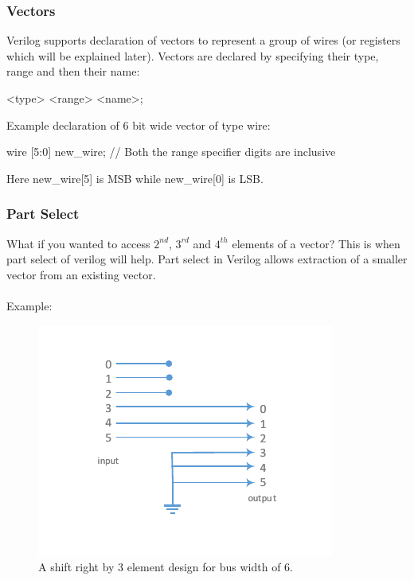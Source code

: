 \documentclass[a4paper,10pt]{article}
\theoremstyle{mytheor}
\newcommand{
  \insertverilog}[3]{
  
}
\begin{document}
\break
\insertverilog{./verilog_files/andGate4.v}{andGate4-wire}{\text{Use of
    wires to connect output of one module to input of another}}

\subsubsection*{Vectors}
Verilog supports declaration of vectors to represent a group of wires
(or registers which will be explained later). Vectors are declared by
specifying their type, range and then their name:
\begin{center}
  <type> <range> <name>;
\end{center}

Example declaration of 6 bit wide vector of type wire:
\begin{center}
  {\color{blue} wire} [{\color{orange}5}:{\color{orange}0}] new\_wire;
  {\color{vgreen}// Both the range specifier digits are inclusive}
\end{center}

Here new\_wire[{\color{orange}5}] is MSB while new\_wire[{\color{orange}0}] is LSB.

\subsubsection*{Part Select}
What if you wanted to access $2^{nd}$, $3^{rd}$ and $4^{th}$ elements of a vector? This is when part select of verilog will help. Part select in Verilog allows extraction of a smaller vector from an existing vector.\\
\vspace{0.2cm}\\
Example:
\insertverilog{./verilog_files/bitExtract.v}{bit-extract}{\text{Using
    bit extract to extract lower, higher and middle 16 bits from a 32
    bit input}}

\begin{figure}[!h] \centering  
  \includegraphics[width=0.45\linewidth]{./resources/shiftUsingWires_representation.pdf}
  \caption{A shift right by 3 element design for bus width of 6.} 
  \label{Fig:shiftUsingWires-representation}
\end{figure}
\end{document}
